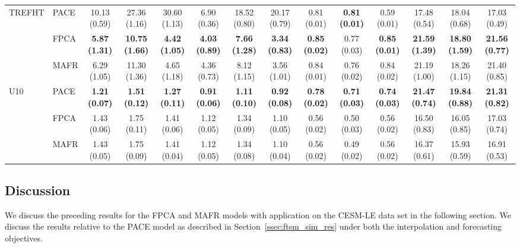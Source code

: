 \begin{landscape}
\begin{table}
{\begin{tabular}{l l c c c c c c c c c c c c}
			\midrule
			\multirow{3}{*}{TREFHT} &PACE & 10.13 (0.59) & 27.36 (1.16) & 30.60 (1.13) & 6.90 (0.36) & 18.52 (0.80) & 20.17 (0.79) & 0.81 (0.01) & \textbf{0.81 (0.01)} & 0.59 (0.01)  & 17.48 (0.54) & 18.04 (0.68) & 17.03 (0.49)  \\
			& FPCA  & \textbf{5.87 (1.31)} & \textbf{10.75 (1.66)} & \textbf{4.42 (1.05)} & \textbf{4.03 (0.89)} & \textbf{7.66 (1.28)} & \textbf{3.34 (0.83)} & \textbf{0.85 (0.02)} & 0.77 (0.03) & \textbf{0.85 (0.01)} & \textbf{21.59 (1.39)} & \textbf{18.80 (1.59)} & \textbf{21.56 (0.77)}  \\
			& MAFR  & 6.29 (1.05) & 11.30 (1.36) & 4.65 (1.18) & 4.36 (0.73) & 8.12 (1.15) & 3.56 (1.01) & 0.84 (0.01) & 0.76 (0.02) & 0.84 (0.02) & 21.19 (1.00) & 18.26 (1.15) & 21.40 (0.85) \\
			\midrule
			\multirow{3}{*}{U10} & PACE & \textbf{1.21 (0.07)} & \textbf{1.51 (0.12)} & \textbf{1.27 (0.11)} & \textbf{0.91 (0.06)} & \textbf{1.11 (0.10)} & \textbf{0.92 (0.08)} & \textbf{0.78 (0.02)} & \textbf{0.71 (0.03)} & \textbf{0.74 (0.03)} & \textbf{21.47 (0.74)} & \textbf{19.84 (0.88)} & \textbf{21.31 (0.82)}  \\
			& FPCA  & 1.43 (0.06) & 1.75 (0.11) & 1.41 (0.06) & 1.12 (0.05) & 1.34 (0.09) & 1.10 (0.05) & 0.56 (0.02) & 0.50 (0.03) & 0.56 (0.02) & 16.50 (0.83) & 16.05 (0.85) & 17.03 (0.74)  \\
			& MAFR  & 1.43 (0.05) & 1.75 (0.09) & 1.41 (0.04) & 1.12 (0.05) & 1.34 (0.08) & 1.10 (0.04) & 0.56 (0.02) & 0.49 (0.02) & 0.56 (0.02)  & 16.37 (0.61) & 15.93 (0.59) & 16.91 (0.53) \\
			\bottomrule
		\end{tabular}}
	\end{table}
\end{landscape}

\subsection{Discussion \label{ssec:ftsm_eo_disc}}
We discuss the preceding results for the FPCA and MAFR models with application on the CESM-LE data set in the following section.
We discuss the results relative to the PACE model as described in Section~\ref{ssec:ftsm_sim_res} under both the interpolation and forecasting objectives.


